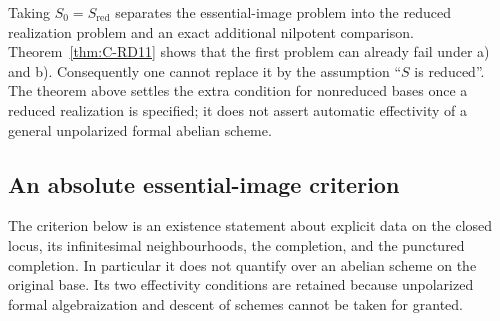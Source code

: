 \begin{remark}\label{auto:C:35345d1cc7ea}

Taking $S_0=S_{\mathrm{red}}$ separates the essential-image problem
into the reduced realization problem and an exact additional
nilpotent comparison. Theorem~\ref{thm:C-RD11} shows that the first
problem can already fail under a) and b). Consequently one cannot
replace it by the assumption ``$S$ is reduced''. The theorem above
settles the extra condition for nonreduced bases once a reduced
realization is specified; it does not assert automatic effectivity
of a general unpolarized formal abelian scheme.
\end{remark}


\subsection{An absolute essential-image criterion}

The criterion below is an existence statement about explicit data on
the closed locus, its infinitesimal neighbourhoods, the completion,
and the punctured completion. In particular it does not quantify over
an abelian scheme on the original base. Its two effectivity conditions
are retained because unpolarized formal algebraization and descent of
schemes cannot be taken for granted.

